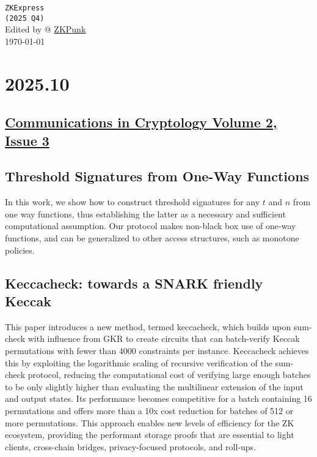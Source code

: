 \documentclass[11pt,oneside]{book}
\theoremstyle{definition}
\theoremstyle{remark}
\theoremstyle{plain}
\begin{document}
\thispagestyle{empty}
\begin{center}
\vfill
{\Huge \texttt{ZKExpress} }\\[0.8em]
{\LARGE\texttt{(2025 Q4)}}\\[2em]
{Edited by  @ \href{https://zkpunk.pro}{ZKPunk}}\\[1em]
{\large\today}
\vfill
\end{center}
\newpage

\tableofcontents
\newpage

\chapter{2025.10}

\section{\href{https://cic.iacr.org/i/2/3}{Communications in Cryptology Volume 2, Issue 3}}
\section{\cite{cryptoeprint:2025/1762} Threshold Signatures from One-Way Functions}
In this work, we show how to construct threshold signatures for any $t$ and $n$ from one way functions, thus establishing the latter as a necessary and sufficient computational assumption. Our protocol makes non-black box use of one-way functions, and can be generalized to other access structures, such as monotone policies.

\section{\cite{cryptoeprint:2025/1764} Keccacheck: towards a SNARK friendly Keccak}
This paper introduces a new method, termed keccacheck, which builds upon sum-check with influence from GKR to create circuits that can batch-verify Keccak permutations with fewer than 4000 constraints per instance. Keccacheck achieves this by exploiting the logarithmic scaling of recursive verification of the sum-check protocol, reducing the computational cost of verifying large enough batches to be only slightly higher than evaluating the multilinear extension of the input and output states. Its performance becomes competitive for a batch containing 16 permutations and offers more than a 10x cost reduction for batches of 512 or more permutations. This approach enables new levels of efficiency for the ZK ecosystem, providing the performant storage proofs that are essential to light clients, cross-chain bridges, privacy-focused protocols, and roll-ups.
\end{document}
